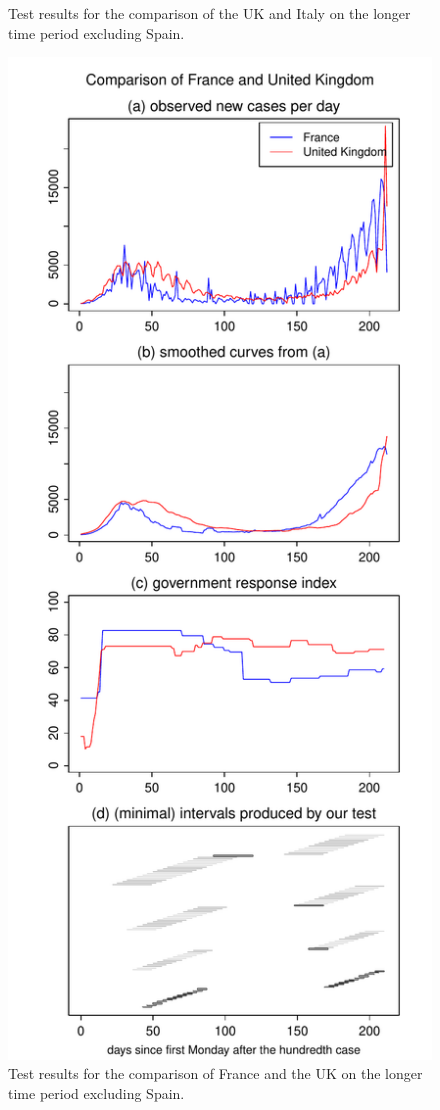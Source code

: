 \documentclass[a4paper,12pt]{article}
\numberwithin{equation}{section}
\begin{document}
\begin{figure}[h!]
\begin{minipage}[t]{0.49\textwidth}
\caption{Test results for the comparison of the UK and Italy on the longer time period excluding Spain.}
\end{minipage}
\hspace{0.25cm}
\begin{minipage}[t]{0.49\textwidth}
\includegraphics[width=\textwidth]{plots/FRA_vs_GBR_four_countries}
\caption{Test results for the comparison of France and the UK on the longer time period excluding Spain.}\label{fig:supp3:last2}
\end{minipage}
\end{figure}
\end{document}
